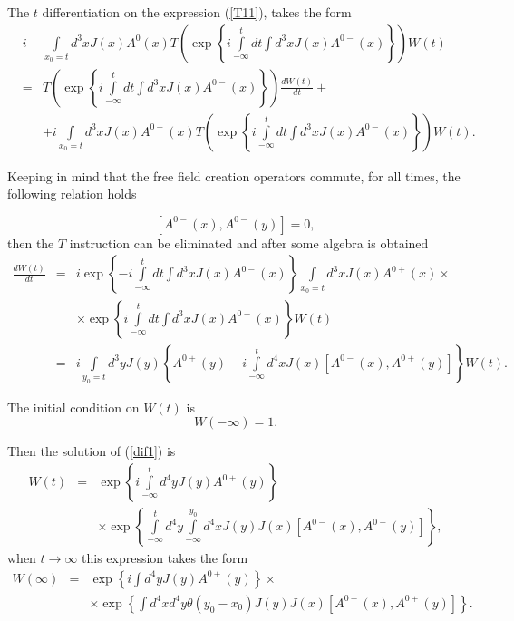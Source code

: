 \documentclass[12pt,letterpaper]{report}
\begin{document}
The $t$ differentiation on the expression (\ref{T11}), takes the
form
\begin{eqnarray}
&i&\int\limits_{x_0=t}d^3xJ\left(x\right) A^0\left(x\right)
T\left(\exp \left\{ i\int\limits_{-\infty }^tdt\int d^3xJ\left(
x\right) A^{0-}\left(x\right) \right\} \right) W\left(t\right)
\nonumber \\ &=&T\left(\exp \left\{ i\int\limits_{-\infty
}^tdt\int d^3xJ\left(x\right) A^{0-}\left(x\right) \right\}
\right) \frac{dW\left(t\right) }{dt}+ \nonumber \\
&&+i\int\limits_{x_0=t}d^3xJ\left(x\right) A^{0-}\left(x\right)
T\left(\exp \left\{ i\int\limits_{-\infty }^tdt\int d^3xJ\left(
x\right) A^{0-}\left(x\right) \right\} \right) W\left(t\right).
\end{eqnarray}

Keeping in mind that the free field creation operators commute,
for all times, the following relation holds

\begin{equation}
\left[ A^{0-}\left(x\right),A^{0-}\left(y\right) \right] =0,
\end{equation}
then the $T$ instruction can be eliminated and after some algebra
is obtained {\setlength\arraycolsep{0.5pt}
\begin{eqnarray}
\frac{dW\left(t\right) }{dt} &=&i\exp \left\{
-i\int\limits_{-\infty }^tdt\int d^3xJ\left(x\right) A^{0-}\left(
x\right) \right\} \int\limits_{x_0=t}d^3xJ\left(x\right)
A^{0+}\left(x\right) \times \nonumber \\ &&\times \exp \left\{
i\int\limits_{-\infty }^tdt\int d^3xJ\left(x\right) A^{0-}\left(
x\right) \right\} W\left(t\right) \nonumber \\
&=&i\int\limits_{y_0=t}d^3yJ\left(y\right) \left\{ A^{0+}\left(
y\right) -i\int\limits_{-\infty }^td^4xJ\left(x\right) \left[
A^{0-}\left(x\right),A^{0+}\left(y\right) \right] \right\} W\left(
t\right). \label{dif1}
\end{eqnarray}}

The initial condition on $W\left(t\right)$ is
\begin{equation}
W\left(-\infty \right) =1.
\end{equation}

Then the solution of (\ref{dif1}) is
\begin{eqnarray*}
W\left(t\right) &=&\exp \left\{ i\int\limits_{-\infty
}^td^4yJ\left(y\right) A^{0+}\left(y\right) \right\}\nonumber
\\&& \times \exp \left\{ \int\limits_{-\infty }^td^4y
\int\limits_{-\infty }^{y_0}d^4xJ\left(y\right) J\left(x\right)
\left[ A^{0-}\left(x\right),A^{0+}\left(y\right) \right] \right\},
\end{eqnarray*}
when $t\rightarrow \infty $ this expression takes the form
\begin{eqnarray*}
W\left(\infty \right) &=&\exp \left\{ i\int d^4yJ\left(y\right)
A^{0+}\left(y\right) \right\} \times \\ &&\times \exp \left\{ \int
d^4xd^4y\theta \left(y_0-x_0\right) J\left(y\right) J\left(
x\right) \left[ A^{0-}\left(x\right),A^{0+}\left(y\right) \right]
\right\}.
\end{eqnarray*}
\end{document}
